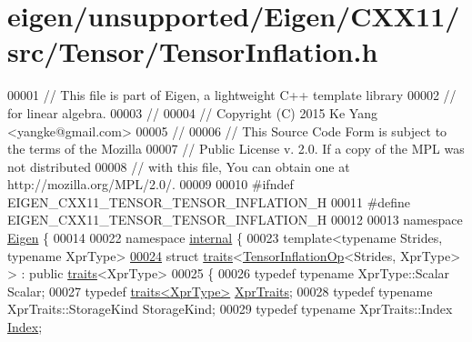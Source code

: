 \hypertarget{eigen_2unsupported_2_eigen_2_c_x_x11_2src_2_tensor_2_tensor_inflation_8h_source}{}\section{eigen/unsupported/\+Eigen/\+C\+X\+X11/src/\+Tensor/\+Tensor\+Inflation.h}
\label{eigen_2unsupported_2_eigen_2_c_x_x11_2src_2_tensor_2_tensor_inflation_8h_source}

\begin{DoxyCode}
00001 \textcolor{comment}{// This file is part of Eigen, a lightweight C++ template library}
00002 \textcolor{comment}{// for linear algebra.}
00003 \textcolor{comment}{//}
00004 \textcolor{comment}{// Copyright (C) 2015 Ke Yang <yangke@gmail.com>}
00005 \textcolor{comment}{//}
00006 \textcolor{comment}{// This Source Code Form is subject to the terms of the Mozilla}
00007 \textcolor{comment}{// Public License v. 2.0. If a copy of the MPL was not distributed}
00008 \textcolor{comment}{// with this file, You can obtain one at http://mozilla.org/MPL/2.0/.}
00009 
00010 \textcolor{preprocessor}{#ifndef EIGEN\_CXX11\_TENSOR\_TENSOR\_INFLATION\_H}
00011 \textcolor{preprocessor}{#define EIGEN\_CXX11\_TENSOR\_TENSOR\_INFLATION\_H}
00012 
00013 \textcolor{keyword}{namespace }\hyperlink{namespace_eigen}{Eigen} \{
00014 
00022 \textcolor{keyword}{namespace }\hyperlink{namespaceinternal}{internal} \{
00023 \textcolor{keyword}{template}<\textcolor{keyword}{typename} Str\textcolor{keywordtype}{id}es, \textcolor{keyword}{typename} XprType>
\hyperlink{struct_eigen_1_1internal_1_1traits_3_01_tensor_inflation_op_3_01_strides_00_01_xpr_type_01_4_01_4}{00024} \textcolor{keyword}{struct }\hyperlink{struct_eigen_1_1internal_1_1traits}{traits}<\hyperlink{class_eigen_1_1_tensor_inflation_op}{TensorInflationOp}<Strides, XprType> > : \textcolor{keyword}{public} 
      \hyperlink{struct_eigen_1_1internal_1_1traits}{traits}<XprType>
00025 \{
00026   \textcolor{keyword}{typedef} \textcolor{keyword}{typename} XprType::Scalar Scalar;
00027   \textcolor{keyword}{typedef} \hyperlink{struct_eigen_1_1internal_1_1traits}{traits<XprType>} \hyperlink{struct_eigen_1_1internal_1_1traits}{XprTraits};
00028   \textcolor{keyword}{typedef} \textcolor{keyword}{typename} XprTraits::StorageKind StorageKind;
00029   \textcolor{keyword}{typedef} \textcolor{keyword}{typename} XprTraits::Index \hyperlink{namespace_eigen_a62e77e0933482dafde8fe197d9a2cfde}{Index};

\end{DoxyCode}
